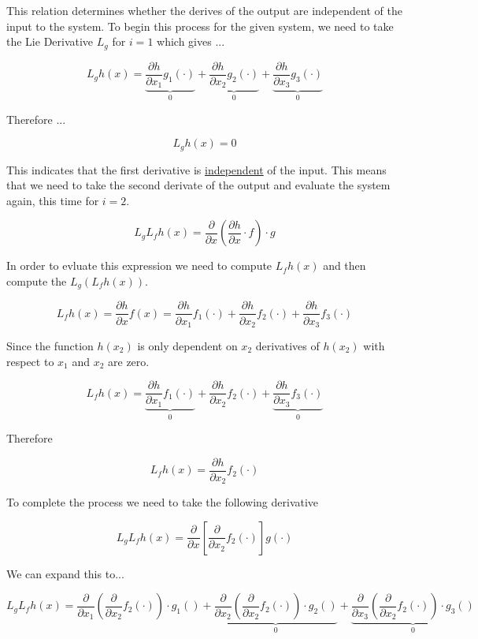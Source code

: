 \noindent This relation determines whether the derives of the output are independent of the input to the system. To begin this process for the given system, we need to take the Lie Derivative $L_g$ for $i = 1$ which gives ...

$$
L_gh(x) = \underbrace{\frac{\partial h}{\partial x_{1}} g_{1}(\cdot)}_0 + \underbrace{\frac{\partial h}{\partial x_{2}} g_{2}(\cdot)}_0 + \underbrace{\frac{\partial h}{\partial x_{3}} g_{3}(\cdot)}_0
$$

\noindent Therefore ...

$$
L_gh(x) = 0
$$

\noindent This indicates that the first derivative is \underline{independent} of the input. This means that we need to take the second derivate of the output and evaluate the system again, this time for $i = 2$.

$$
L_gL_fh(x) =
\frac{\partial}{\partial x}\left(\frac{\partial h}{\partial x} \cdot f\right) \cdot g
$$

\noindent In order to evluate this expression we need to compute $L_fh(x)$ and then compute the $L_g(L_fh(x))$.

$$
L_fh(x)= \frac{\partial h}{\partial x} f(x)=\frac{\partial h}{\partial x_{1}} f_{1}(\cdot)+\frac{\partial h}{\partial x_{2}} f_{2}(\cdot)+\frac{\partial h}{\partial x_{3}} f_{3}(\cdot)
$$


\noindent Since the function $h(x_2)$ is only dependent on $x_2$ derivatives of $h(x_2)$ with respect to $x_1$ and $x_2$ are zero.

$$
L_fh(x)= \underbrace{\frac{\partial h}{\partial x_{1}} f_{1}(\cdot)}_0 + \frac{\partial h}{\partial x_{2}} f_{2}(\cdot) + \underbrace{\frac{\partial h}{\partial x_{3}} f_{3}(\cdot)}_0
$$


\noindent Therefore

$$
L_fh(x)= \frac{\partial h}{\partial x_{2}} f_{2}(\cdot)
$$


\noindent To complete the process we need to take the following derivative

$$
L_gL_fh(x) = \frac{\partial}{\partial x} \left[ \frac{\partial}{\partial x_2}f_2(\cdot) \right] g(\cdot)
$$


\noindent We can expand this to...

$$
L_gL_fh(x) = \frac{\partial}{\partial x_1}(\frac{\partial}{\partial x_2}f_2(\cdot))\cdot g_1() + \underbrace{\frac{\partial}{\partial x_2}(\frac{\partial}{\partial x_2}f_2(\cdot))\cdot g_2()}_0 + \underbrace{\frac{\partial}{\partial x_3}(\frac{\partial}{\partial x_2}f_2(\cdot))\cdot g_3()}_0
$$


